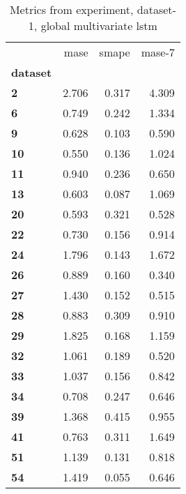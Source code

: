 \begin{table}[h]
\centering
\caption{Metrics from experiment, dataset-1, global multivariate lstm}
\label{table:global-multivariate-lstm-dataset-1}
\begin{tabular}{lrrr}
\toprule
{} &   mase &  smape &  mase-7 \\
\textbf{dataset} &        &        &         \\
\midrule
\textbf{2      } &  2.706 &  0.317 &   4.309 \\
\textbf{6      } &  0.749 &  0.242 &   1.334 \\
\textbf{9      } &  0.628 &  0.103 &   0.590 \\
\textbf{10     } &  0.550 &  0.136 &   1.024 \\
\textbf{11     } &  0.940 &  0.236 &   0.650 \\
\textbf{13     } &  0.603 &  0.087 &   1.069 \\
\textbf{20     } &  0.593 &  0.321 &   0.528 \\
\textbf{22     } &  0.730 &  0.156 &   0.914 \\
\textbf{24     } &  1.796 &  0.143 &   1.672 \\
\textbf{26     } &  0.889 &  0.160 &   0.340 \\
\textbf{27     } &  1.430 &  0.152 &   0.515 \\
\textbf{28     } &  0.883 &  0.309 &   0.910 \\
\textbf{29     } &  1.825 &  0.168 &   1.159 \\
\textbf{32     } &  1.061 &  0.189 &   0.520 \\
\textbf{33     } &  1.037 &  0.156 &   0.842 \\
\textbf{34     } &  0.708 &  0.247 &   0.646 \\
\textbf{39     } &  1.368 &  0.415 &   0.955 \\
\textbf{41     } &  0.763 &  0.311 &   1.649 \\
\textbf{51     } &  1.139 &  0.131 &   0.818 \\
\textbf{54     } &  1.419 &  0.055 &   0.646 \\
\bottomrule
\end{tabular}
\end{table}
